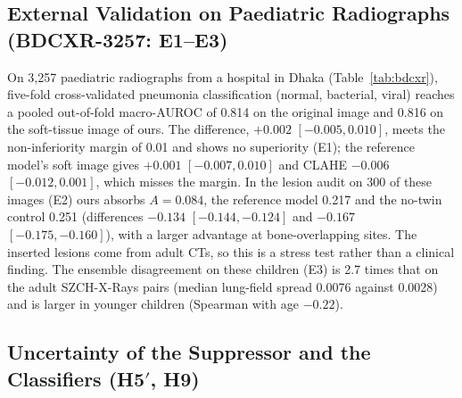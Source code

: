 \subsection{External Validation on Paediatric Radiographs (BDCXR-3257: E1--E3)}
\label{sec:res-bdcxr}
On 3,257 paediatric radiographs from a hospital in Dhaka (Table~\ref{tab:bdcxr}), five-fold cross-validated pneumonia classification
(normal, bacterial, viral) reaches a pooled out-of-fold macro-AUROC of 0.814 on the original image and 0.816 on the soft-tissue image of
ours. The difference, $+0.002$ $[-0.005,0.010]$, meets the non-inferiority margin of 0.01 and shows no superiority (E1); the reference
model's soft image gives $+0.001$ $[-0.007,0.010]$ and CLAHE $-0.006$ $[-0.012,0.001]$, which misses the margin. In the lesion audit on 300
of these images (E2) ours absorbs $A=0.084$, the reference model 0.217 and the no-twin control 0.251 (differences $-0.134$
$[-0.144,-0.124]$ and $-0.167$ $[-0.175,-0.160]$), with a larger advantage at bone-overlapping sites. The inserted lesions come from adult
CTs, so this is a stress test rather than a clinical finding. The ensemble disagreement on these children (E3) is 2.7 times that on the
adult SZCH-X-Rays pairs (median lung-field spread 0.0076 against 0.0028) and is larger in younger children (Spearman with age $-0.22$).

\begin{table}[!t]
\centering
\caption{BDCXR-3257. Top (E1): pneumonia classification (normal, bacterial, viral), five folds over near-duplicate groups $\times$ three
seeds; pooled out-of-fold macro-AUROC, per-fold mean $\pm$ SD, the difference to the original image (group bootstrap), per-class AUROC and
balanced accuracy. Bottom (E2): lesion audit on a fixed class-stratified subset of 300 images (1,800 sites).}
\label{tab:bdcxr}
\end{table}

\subsection{Uncertainty of the Suppressor and the Classifiers (H5\texorpdfstring{$'$}{'}, H9)}
\label{sec:res-uq}

